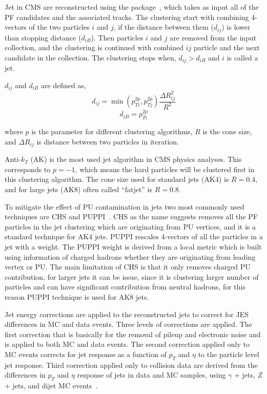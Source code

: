 Jet in \gls{CMS} are reconstructed using the \FASTJET{} package~\cite{fastjet-manual},
which takes as input all of the \gls{PF} candidates and the associated tracks.
The clustering start with combining 4-vectors of the two particles \(i\) and  \(j\), if the distance between
them (\( d_{ij} \)) is lower than stopping distance (\( d_{iB} \)).
Then particles \(i\) and  \(j\) are removed from the input collection,
and the clustering is continued with combined \(ij\) particle and the next candidate in
the collection.
The clustering stops when, \( d_{ij} > d_{iB} \) and \( i \) is called a jet.

\( d_{ij} \) and \( d_{iB} \) are defined as,
%
\begin{equation}
  d_{ij} = \min (p_{Ti}^{2p}, p_{Tj}^{2p}) \frac{\Delta R_{ij}^{2}}{R^{2}}
\end{equation}
%
\begin{equation}
  d_{iB} = p_{Ti}^{2p}
\end{equation}

where \( p \) is the parameter for different clustering algorithms, \( R \) is the
cone size, and
\( \Delta R_{ij} \) is distance between two particles in iteration.

Anti-\( k_T \) (AK) is the most used jet algorithm in \gls{CMS} physics analyses. This corresponds to
\( p = -1\), which means the hard particles will be clustered first in this clustering
algorithm.
The cone size used for standard jets (AK4) is \( R = 0.4 \), and for large jets (AK8) often called
``fatjet'' is \( R = 0.8 \).

To mitigate the effect of \gls{PU} contamination in jets two most commonly used
techniques are \gls{CHS} and \gls{PUPPI}~\cite{puppi2014}.
\gls{CHS} as the name suggests removes all the \gls{PF} particles in the jet clustering which are
originating from \gls{PU} vertices, and it is a standard technique for AK4 jets.
\gls{PUPPI} rescales 4-vectors of all the particles in a jet with a weight.
The \gls{PUPPI} weight is derived from a local metric which is built
using information of charged hadrons whether they are
originating from leading vertex or \gls{PU}.
The main limitation of \gls{CHS} is that it only removes charged \gls{PU} contribution,
for larger jets it can be issue, since it is clustering larger number of particles
and can have significant contribution from neutral hadrons, for this reason \gls{PUPPI}
technique is used for AK8 jets.

Jet energy corrections are applied to the reconstructed
jets to correct for \gls{JES} differences in \gls{MC} and data events.
Three levels of corrections are applied.
The first correction that is basically for the removal of pileup and electronic noise
and is applied to both \gls{MC} and data events. The
second correction applied only to \gls{MC} events
corrects for jet response as a function of \( p_T \) and
\( \eta \) to the particle level jet response. Third
correction applied only to collision data
are derived from the differences in \(p_T\) and \(\eta \)
response of jets in data and \gls{MC} samples,
using \( \gamma \) + jets, \textit{Z} + jets, and dijet \gls{MC} events~\cite{CMS-DP-2020-019}.


